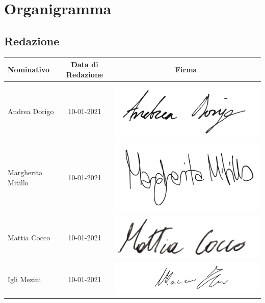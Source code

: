 \chapter{Organigramma}\label{Organigramma}

\section{Redazione}\label{OrganigrammaRedazione}
\quad
\def\tabularxcolumn#1{m{#1}}
{	
	\begin{center}
		\renewcommand{\arraystretch}{1.4}
		\begin{tabularx}{\textwidth}{|X|c|c|}
			\hline
			\rowcolor{airforceblue}
			\textbf{Nominativo} & \textbf{Data di Redazione} & \textbf{Firma}\\
			\hline
			Andrea Dorigo & 10-01-2021 & \includegraphics[width=0.2\linewidth]{../immagini/firme/firma_andrea_dorigo.png}\\
			\hline
			Margherita Mitillo & 10-01-2021 & \includegraphics[width=0.2\linewidth]{../immagini/firme/firma_margherita.png}\\
			\hline
			Mattia Cocco & 10-01-2021 &\includegraphics[width=0.2\linewidth]{../immagini/firme/firma_mattia.png}\\
			\hline
			Igli Mezini & 10-01-2021 &\includegraphics[width=0.3\linewidth]{../immagini/firme/firma_igli.png}\\
			\hline
		\end{tabularx}
	\end{center}

}
